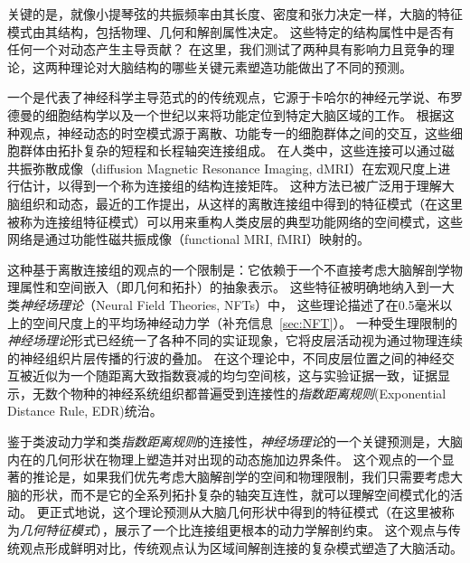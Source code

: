 \documentclass[lang=cn,a4paper,newtx,citestyle=gb7714-2015, bibstyle=gb7714-2015]{elegantpaper}
\begin{document}
关键的是，就像小提琴弦的共振频率由其长度、密度和张力决定一样，大脑的特征模式由其结构，包括物理、几何和解剖属性决定。
这些特定的结构属性中是否有任何一个对动态产生主导贡献？
在这里，我们测试了两种具有影响力且竞争的理论，这两种理论对大脑结构的哪些关键元素塑造功能做出了不同的预测。


一个是代表了神经科学主导范式的的传统观点，它源于卡哈尔的神经元学说\cite{jones1999golgi}、布罗德曼的细胞结构学以及一个世纪以来将功能定位到特定大脑区域的工作\cite{broca1861remarques}。
根据这种观点，神经动态的时空模式源于离散、功能专一的细胞群体之间的交互，这些细胞群体由拓扑复杂的短程和长程轴突连接组成\cite{bullmore2009complex,yuste2015neuron}。
在人类中，这些连接可以通过磁共振弥散成像（diffusion Magnetic Resonance Imaging, dMRI）在宏观尺度上进行估计，以得到一个称为连接组的结构连接矩阵\cite{fornito2016fundamentals}。
这种方法已被广泛用于理解大脑组织和动态\cite{bullmore2009complex,fornito2016fundamentals,breakspear2017dynamic}，最近的工作提出，从这样的离散连接组中得到的特征模式（在这里被称为连接组特征模式）可以用来重构人类皮层的典型功能网络的空间模式，这些网络是通过功能性磁共振成像（functional MRI, fMRI）映射的\cite{atasoy2016human,preti2019decoupling}。


这种基于离散连接组的观点的一个限制是：它依赖于一个不直接考虑大脑解剖学物理属性和空间嵌入（即几何和拓扑）的抽象表示。
这些特征被明确地纳入到一大类\textit{神经场理论}（Neural Field Theories, NFTs）中\cite{wright1995simulation,jirsa1996field,robinson1997propagation}，
这些理论描述了在0.5毫米以上的空间尺度上的平均场神经动力学（补充信息~\ref{sec:NFT}）。
一种受生理限制的\textit{神经场理论}形式已经统一了各种不同的实证现象\cite{robinson1997propagation,robinson2005multiscale}，它将皮层活动视为通过物理连续的神经组织片层传播的行波的叠加。
在这个理论中，不同皮层位置之间的神经交互被近似为一个随距离大致指数衰减的均匀空间核\cite{robinson2019physical}，这与实验证据一致，证据显示，无数个物种的神经系统组织都普遍受到连接性的\textit{指数距离规则}(Exponential Distance Rule, EDR)统治\cite{braitenberg2013cortex,wang2016brain,roberts2017consistency}。


鉴于类波动力学和类\textit{指数距离规则}的连接性，\textit{神经场理论}的一个关键预测是，大脑内在的几何形状在物理上塑造并对出现的动态施加边界条件\cite{robinson2016eigenmodes,gabay2017cortical,gabay2018dynamics}。
这个观点的一个显著的推论是，如果我们优先考虑大脑解剖学的空间和物理限制，我们只需要考虑大脑的形状，而不是它的全系列拓扑复杂的轴突互连性，就可以理解空间模式化的活动。
更正式地说，这个理论预测从大脑几何形状中得到的特征模式（在这里被称为\textit{几何特征模式}），展示了一个比连接组更根本的动力学解剖约束\cite{robinson2016eigenmodes,gabay2017cortical,gabay2018dynamics}。
这个观点与传统观点形成鲜明对比，传统观点认为区域间解剖连接的复杂模式塑造了大脑活动\cite{honey2007network}。
\end{document}
